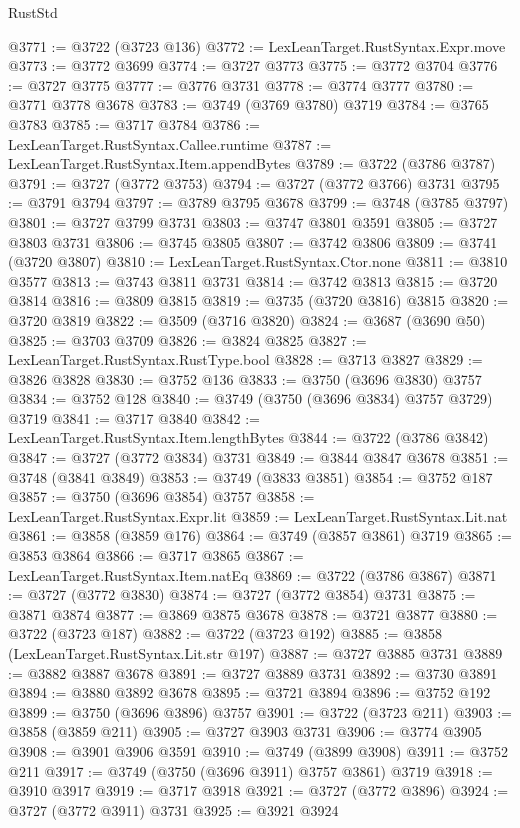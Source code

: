 \begin{lexlean}{RustStd}
\begin{coremodule}
@3771 := @3722 (@3723 @136)
@3772 := LexLeanTarget.RustSyntax.Expr.move
@3773 := @3772 @3699
@3774 := @3727 @3773
@3775 := @3772 @3704
@3776 := @3727 @3775
@3777 := @3776 @3731
@3778 := @3774 @3777
@3780 := @3771 @3778 @3678
@3783 := @3749 (@3769 @3780) @3719
@3784 := @3765 @3783
@3785 := @3717 @3784
@3786 := LexLeanTarget.RustSyntax.Callee.runtime
@3787 := LexLeanTarget.RustSyntax.Item.appendBytes
@3789 := @3722 (@3786 @3787)
@3791 := @3727 (@3772 @3753)
@3794 := @3727 (@3772 @3766) @3731
@3795 := @3791 @3794
@3797 := @3789 @3795 @3678
@3799 := @3748 (@3785 @3797)
@3801 := @3727 @3799 @3731
@3803 := @3747 @3801 @3591
@3805 := @3727 @3803 @3731
@3806 := @3745 @3805
@3807 := @3742 @3806
@3809 := @3741 (@3720 @3807)
@3810 := LexLeanTarget.RustSyntax.Ctor.none
@3811 := @3810 @3577
@3813 := @3743 @3811 @3731
@3814 := @3742 @3813
@3815 := @3720 @3814
@3816 := @3809 @3815
@3819 := @3735 (@3720 @3816) @3815
@3820 := @3720 @3819
@3822 := @3509 (@3716 @3820)
@3824 := @3687 (@3690 @50)
@3825 := @3703 @3709
@3826 := @3824 @3825
@3827 := LexLeanTarget.RustSyntax.RustType.bool
@3828 := @3713 @3827
@3829 := @3826 @3828
@3830 := @3752 @136
@3833 := @3750 (@3696 @3830) @3757
@3834 := @3752 @128
@3840 := @3749 (@3750 (@3696 @3834) @3757 @3729) @3719
@3841 := @3717 @3840
@3842 := LexLeanTarget.RustSyntax.Item.lengthBytes
@3844 := @3722 (@3786 @3842)
@3847 := @3727 (@3772 @3834) @3731
@3849 := @3844 @3847 @3678
@3851 := @3748 (@3841 @3849)
@3853 := @3749 (@3833 @3851)
@3854 := @3752 @187
@3857 := @3750 (@3696 @3854) @3757
@3858 := LexLeanTarget.RustSyntax.Expr.lit
@3859 := LexLeanTarget.RustSyntax.Lit.nat
@3861 := @3858 (@3859 @176)
@3864 := @3749 (@3857 @3861) @3719
@3865 := @3853 @3864
@3866 := @3717 @3865
@3867 := LexLeanTarget.RustSyntax.Item.natEq
@3869 := @3722 (@3786 @3867)
@3871 := @3727 (@3772 @3830)
@3874 := @3727 (@3772 @3854) @3731
@3875 := @3871 @3874
@3877 := @3869 @3875 @3678
@3878 := @3721 @3877
@3880 := @3722 (@3723 @187)
@3882 := @3722 (@3723 @192)
@3885 := @3858 (LexLeanTarget.RustSyntax.Lit.str @197)
@3887 := @3727 @3885 @3731
@3889 := @3882 @3887 @3678
@3891 := @3727 @3889 @3731
@3892 := @3730 @3891
@3894 := @3880 @3892 @3678
@3895 := @3721 @3894
@3896 := @3752 @192
@3899 := @3750 (@3696 @3896) @3757
@3901 := @3722 (@3723 @211)
@3903 := @3858 (@3859 @211)
@3905 := @3727 @3903 @3731
@3906 := @3774 @3905
@3908 := @3901 @3906 @3591
@3910 := @3749 (@3899 @3908)
@3911 := @3752 @211
@3917 := @3749 (@3750 (@3696 @3911) @3757 @3861) @3719
@3918 := @3910 @3917
@3919 := @3717 @3918
@3921 := @3727 (@3772 @3896)
@3924 := @3727 (@3772 @3911) @3731
@3925 := @3921 @3924

\end{coremodule}
\end{lexlean}
